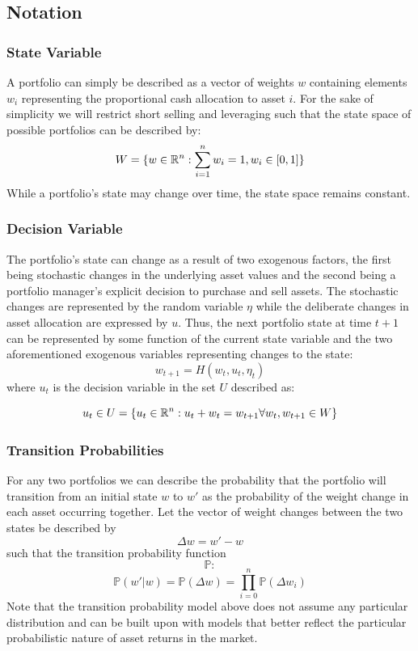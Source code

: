 \documentclass{article}
\begin{document}
\subsection{Notation}

\subsubsection{State Variable}
A portfolio can simply be described as a vector of weights $w$ containing elements $w_i$ representing the proportional cash allocation to asset $i$. For the sake of simplicity we will restrict short selling and leveraging such that the state space of possible portfolios can be described by: 
\begin{equation}
W = \{w \in \mathbb{R}^n : \sum_{i = 1}^{n} w_i = 1,  w_i \in [0, 1] \} \label{eq:state-space}
\end{equation}
While a portfolio's state may change over time, the state space remains constant.

\subsubsection{Decision Variable}
The portfolio's state can change as a result of two exogenous factors, the first being stochastic changes in the underlying asset values and the second being a portfolio manager's explicit decision to purchase and sell assets. The stochastic changes are represented by the random variable $\eta$ while the deliberate changes in asset allocation are expressed by $u$. Thus, the next portfolio state at time $t+1$ can be represented by some function of the current state variable and the two aforementioned exogenous variables representing changes to the state: 
\begin{equation}
w_{t+1} = H(w_t, u_t, \eta_t) \label{eq:state-transition}
\end{equation}
where $u_t$ is the decision variable in the set $U$ described as:

\begin{equation}
u_t \in U = \{u_t \in \mathbb{R}^n : u_t + w_t = w_{t+1} \forall w_t, w_{t+1} \in W\} \label{eq:decision-space}
\end{equation}

\subsubsection{Transition Probabilities}
For any two portfolios we can describe the probability that the portfolio will transition from an initial state $w$ to $w'$ as the probability of the weight change in each asset occurring together. Let the vector of weight changes between the two states be described by $$\Delta w = w' - w$$ such that the transition probability function $$\mathbb{P}: $$ 
\begin{equation}
\mathbb{P}(w'|w) = \mathbb{P}(\Delta w) = \prod_{i = 0}^{n}\mathbb{P}(\Delta w_i) \label{eq:transition-prob}
\end{equation}
Note that the transition probability model above does not assume any particular distribution and can be built upon with models that better reflect the particular probabilistic nature of asset returns in the market.
\end{document}
